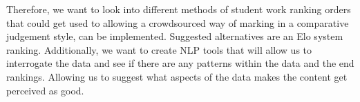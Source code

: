 	Therefore, we want to look into different methods of student work ranking orders that could get used to allowing a crowdsourced way of marking in a comparative judgement style, can be implemented. Suggested alternatives are an Elo system ranking. Additionally, we want to create NLP tools that will allow us to interrogate the data and see if there are any patterns within the data and the end rankings. Allowing us to suggest what aspects of the data makes the content get perceived as good.
